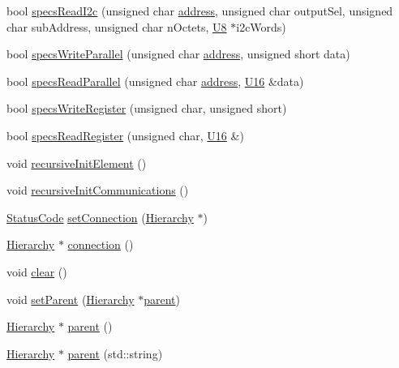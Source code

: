 \begin{DoxyCompactItemize}
bool \hyperlink{classSpecsInterface_ad27047eaae1bc333ee0c1a6c871a407b}{specs\+Read\+I2c} (unsigned char \hyperlink{classSpecsInterface_a0fa039a15b842a5ba783ce825b9915d8}{address}, unsigned char output\+Sel, unsigned char sub\+Address, unsigned char n\+Octets, \hyperlink{ICECALv3_8h_a3cb25ca6f51f003950f9625ff05536fc}{U8} $\ast$i2c\+Words)
\item 
bool \hyperlink{classSpecsInterface_a232c39e46091c493ad9d061428dd2a8b}{specs\+Write\+Parallel} (unsigned char \hyperlink{classSpecsInterface_a0fa039a15b842a5ba783ce825b9915d8}{address}, unsigned short data)
\item 
bool \hyperlink{classSpecsInterface_aefbe6b92a9f9e2f00bf41dd8b2605c05}{specs\+Read\+Parallel} (unsigned char \hyperlink{classSpecsInterface_a0fa039a15b842a5ba783ce825b9915d8}{address}, \hyperlink{ICECALv3_8h_adf928e51a60dba0df29d615401cc55a8}{U16} \&data)
\item 
bool \hyperlink{classSpecsInterface_ab70adfa5ad87097469c7485126a3c61a}{specs\+Write\+Register} (unsigned char, unsigned short)
\item 
bool \hyperlink{classSpecsInterface_a87080bb575d1b9d0bb313c48e7d3f59a}{specs\+Read\+Register} (unsigned char, \hyperlink{ICECALv3_8h_adf928e51a60dba0df29d615401cc55a8}{U16} \&)
\item 
void \hyperlink{classElement_a3c0abcb36f8906688bb7e32608df7086}{recursive\+Init\+Element} ()
\item 
void \hyperlink{classElement_a82119ed37dff76508a2746a853ec35ba}{recursive\+Init\+Communications} ()
\item 
\hyperlink{classStatusCode}{Status\+Code} \hyperlink{classElement_ab476b4b1df5954141ceb14f072433b89}{set\+Connection} (\hyperlink{classHierarchy}{Hierarchy} $\ast$)
\item 
\hyperlink{classHierarchy}{Hierarchy} $\ast$ \hyperlink{classElement_af57444353c1ddf9fa0109801e97debf7}{connection} ()
\item 
void \hyperlink{classHierarchy_af4d43b0765b402670eed2d62c73405af}{clear} ()
\item 
void \hyperlink{classHierarchy_a585ad1aeec16077a0e532ab8b4fc557b}{set\+Parent} (\hyperlink{classHierarchy}{Hierarchy} $\ast$\hyperlink{classHierarchy_a1c7bec8257e717f9c1465e06ebf845fc}{parent})
\item 
\hyperlink{classHierarchy}{Hierarchy} $\ast$ \hyperlink{classHierarchy_a1c7bec8257e717f9c1465e06ebf845fc}{parent} ()
\item 
\hyperlink{classHierarchy}{Hierarchy} $\ast$ \hyperlink{classHierarchy_ad550588733bf75ac5c0fcfd7c8fd11a6}{parent} (std\+::string)

\end{DoxyCompactItemize}
